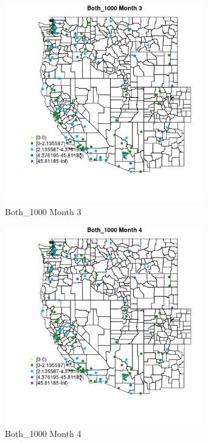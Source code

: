 \begin{figure} 
\centering  
\includegraphics[width=0.77\textwidth]{Code_Outputs/Report_ML_input_PM25_Step4_part_e_de_duplicated_aves_MapObsMo3Both_1000.jpg} 
\caption{\label{fig:Report_ML_input_PM25_Step4_part_e_de_duplicated_avesMapObsMo3Both_1000}Both_1000 Month 3} 
\end{figure} 
 

\begin{figure} 
\centering  
\includegraphics[width=0.77\textwidth]{Code_Outputs/Report_ML_input_PM25_Step4_part_e_de_duplicated_aves_MapObsMo4Both_1000.jpg} 
\caption{\label{fig:Report_ML_input_PM25_Step4_part_e_de_duplicated_avesMapObsMo4Both_1000}Both_1000 Month 4} 
\end{figure} 
 


